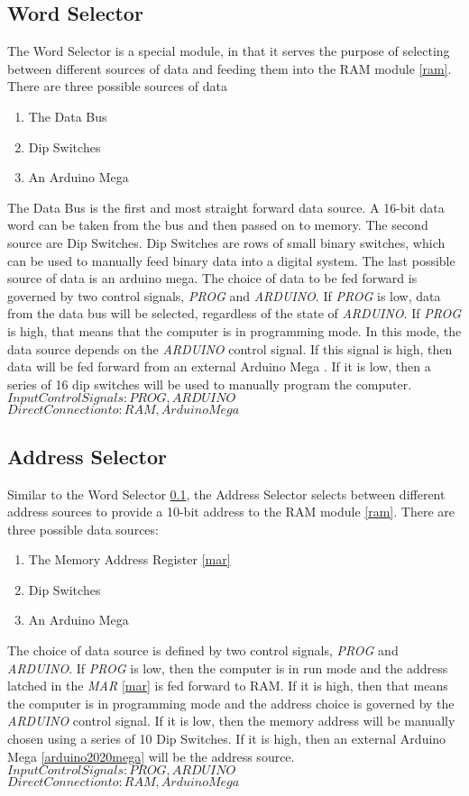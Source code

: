 \subsection{Word Selector} \label{word-select}
The Word Selector is a special module, in that it serves the purpose of selecting between different sources of data and feeding
them into the RAM module \ref{ram}. There are three possible sources of data
\begin{enumerate}
  \item The Data Bus
  \item Dip Switches
  \item An Arduino Mega
\end{enumerate}
The Data Bus is the first and most straight forward data source. A 16-bit data word can be taken from the bus and then passed on
to memory. The second source are Dip Switches. Dip Switches are rows of small binary switches, which can be used to manually feed
binary data into a digital system. The last possible source of data is an arduino mega. The choice of data to be fed forward is
governed by two control signals, \emph{PROG} and \emph{ARDUINO}. If \emph{PROG} is low, data from the data bus will be selected,
regardless of the state of \emph{ARDUINO}. If \emph{PROG} is high, that means that the computer is in programming mode. In this
mode, the data source depends on the \emph{ARDUINO} control signal. If this signal is high, then data will be fed forward from
an external Arduino Mega \cite{arduino2020mega}. If it is low, then a series of 16 dip switches will be used to manually program
the computer.  \\
\textbf{$Input Control Signals: PROG, ARDUINO$} \\
\textbf{$Direct Connection to: RAM, Arduino Mega$}

\subsection{Address Selector} \label{addr-select}
Similar to the Word Selector \ref{word-select}, the Address Selector selects between different address sources to provide a 10-bit
address to  the RAM module \ref{ram}. There are three possible data sources:
\begin{enumerate}
  \item The Memory Address Register \ref{mar}
  \item Dip Switches
  \item An Arduino Mega
\end{enumerate}
The choice of data source is defined by two control signals, \emph{PROG} and \emph{ARDUINO}. If \emph{PROG} is low, then the
computer is in run mode and the address latched in the \emph{MAR} \ref{mar} is fed forward to RAM. If it is high, then that means
the computer is in programming mode and the address choice is governed by the \emph{ARDUINO} control signal. If it is low, then
the memory address will be manually chosen using a series of 10 Dip Switches. If it is high, then an external
Arduino Mega \ref{arduino2020mega} will be the address source. \\
\textbf{$Input Control Signals: PROG, ARDUINO$}
\textbf{$Direct Connection to: RAM, Arduino Mega$}

